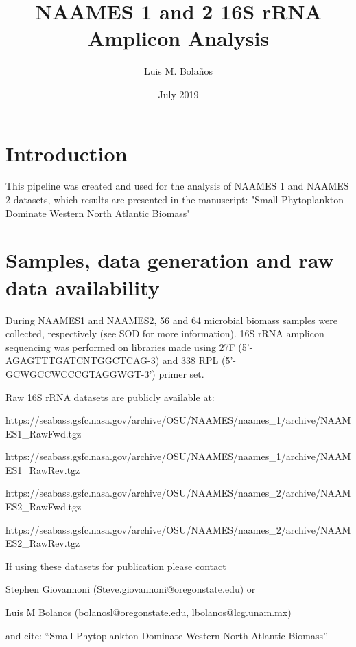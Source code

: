 \documentclass{article}
\begin{document}
\sloppy

\title{NAAMES 1 and 2 16S rRNA Amplicon Analysis}
\author{Luis M. Bola\~nos}
\date{July 2019}
\maketitle

\tableofcontents

\section{Introduction}

This pipeline was created and used for the analysis of NAAMES 1 and NAAMES 2 datasets, which results are presented in the manuscript: "Small Phytoplankton Dominate Western North Atlantic Biomass"

\section{Samples, data generation and raw data availability}\sloppy

During NAAMES1 and NAAMES2, 56 and 64 microbial biomass samples were collected, respectively (see SOD for more information). 16S rRNA amplicon sequencing was performed on libraries made using 27F (5'-AGAGTTTGATCNTGGCTCAG-3) and 338 RPL (5'- GCWGCCWCCCGTAGGWGT-3') primer set. 

Raw 16S rRNA datasets are publicly available at:
\begin{description}\sloppy
\item[$-$] https://seabass.gsfc.nasa.gov/archive/OSU/NAAMES/naames\_1/archive/NAAMES1\_RawFwd.tgz
\item[$-$] https://seabass.gsfc.nasa.gov/archive/OSU/NAAMES/naames\_1/archive/NAAMES1\_RawRev.tgz

\item[$-$] https://seabass.gsfc.nasa.gov/archive/OSU/NAAMES/naames\_2/archive/NAAMES2\_RawFwd.tgz
\item[$-$] https://seabass.gsfc.nasa.gov/archive/OSU/NAAMES/naames\_2/archive/NAAMES2\_RawRev.tgz
\end{description}

If using these datasets for publication please contact 
\begin{description}\sloppy
\item[$\bullet$] Stephen Giovannoni (Steve.giovannoni@oregonstate.edu) or
\item[$\bullet$] Luis M Bolanos (bolanosl@oregonstate.edu, lbolanos@lcg.unam.mx) 
\item[$\bullet$] and cite: “Small Phytoplankton Dominate Western North Atlantic Biomass”
\end{description}
\end{document}
